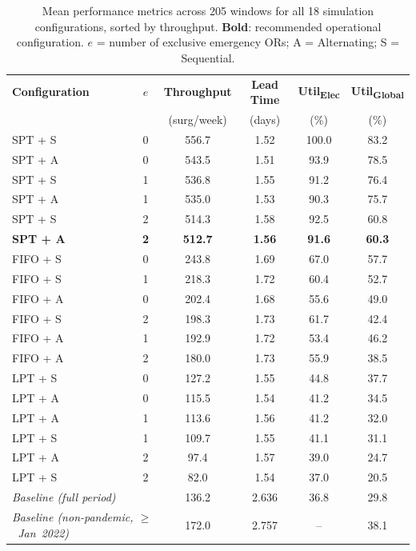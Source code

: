 \documentclass[sn-mathphys-num]{sn-jnl}
\begin{document}
\begin{table}[ht]
  \centering
  \caption{Mean performance metrics across 205 windows for all
           18 simulation configurations, sorted by throughput.
           \textbf{Bold}: recommended operational configuration.
           $e$ = number of exclusive emergency ORs;
           A = Alternating; S = Sequential.}
  \label{tab:config_summary}
  \small
  \begin{tabular}{lccccc}
    \toprule
    \textbf{Configuration} & $e$ &
    \textbf{Throughput} & \textbf{Lead Time} &
    \textbf{Util\textsubscript{Elec}} &
    \textbf{Util\textsubscript{Global}} \\
    & & (surg/week) & (days) & (\%) & (\%) \\
    \midrule
    SPT + S & 0 & 556.7 & 1.52 & 100.0 & 83.2 \\
    SPT + A & 0 & 543.5 & 1.51 &  93.9 & 78.5 \\
    SPT + S & 1 & 536.8 & 1.55 &  91.2 & 76.4 \\
    SPT + A & 1 & 535.0 & 1.53 &  90.3 & 75.7 \\
    SPT + S & 2 & 514.3 & 1.58 &  92.5 & 60.8 \\
    \textbf{SPT + A} & \textbf{2} &
      \textbf{512.7} & \textbf{1.56} &
      \textbf{91.6} & \textbf{60.3} \\
    FIFO + S & 0 & 243.8 & 1.69 &  67.0 & 57.7 \\
    FIFO + S & 1 & 218.3 & 1.72 &  60.4 & 52.7 \\
    FIFO + A & 0 & 202.4 & 1.68 &  55.6 & 49.0 \\
    FIFO + S & 2 & 198.3 & 1.73 &  61.7 & 42.4 \\
    FIFO + A & 1 & 192.9 & 1.72 &  53.4 & 46.2 \\
    FIFO + A & 2 & 180.0 & 1.73 &  55.9 & 38.5 \\
    LPT + S  & 0 & 127.2 & 1.55 &  44.8 & 37.7 \\
    LPT + A  & 0 & 115.5 & 1.54 &  41.2 & 34.5 \\
    LPT + A  & 1 & 113.6 & 1.56 &  41.2 & 32.0 \\
    LPT + S  & 1 & 109.7 & 1.55 &  41.1 & 31.1 \\
    LPT + A  & 2 &  97.4 & 1.57 &  39.0 & 24.7 \\
    LPT + S  & 2 &  82.0 & 1.54 &  37.0 & 20.5 \\
    \midrule
    \multicolumn{2}{l}{\textit{Baseline (full period)}} &
      136.2 & 2.636 & 36.8 & 29.8 \\
    \multicolumn{2}{l}{\textit{Baseline (non-pandemic,
      $\geq$~Jan~2022)}} &
      172.0 & 2.757 & -- & 38.1 \\
    \bottomrule
  \end{tabular}
\end{table}
\end{document}
